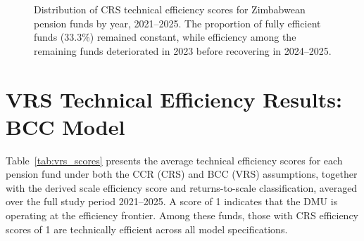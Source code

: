 \documentclass[12pt,a4paper]{article}
\begin{document}
\begin{figure}[H]
\centering
{}
\caption{Distribution of CRS technical efficiency scores for Zimbabwean pension funds by year, 2021--2025. The proportion of fully efficient funds (33.3\%) remained constant, while efficiency among the remaining funds deteriorated in 2023 before recovering in 2024--2025.}
\label{fig:crs_distribution}
\end{figure}

\section{VRS Technical Efficiency Results: BCC Model}

Table~\ref{tab:vrs_scores} presents the average technical efficiency scores for each pension fund under both the CCR (CRS) and BCC (VRS) assumptions, together with the derived scale efficiency score and returns-to-scale classification, averaged over the full study period 2021--2025. A score of 1 indicates that the DMU is operating at the efficiency frontier. Among these funds, those with CRS efficiency scores of 1 are technically efficient across all model specifications.
\end{document}
